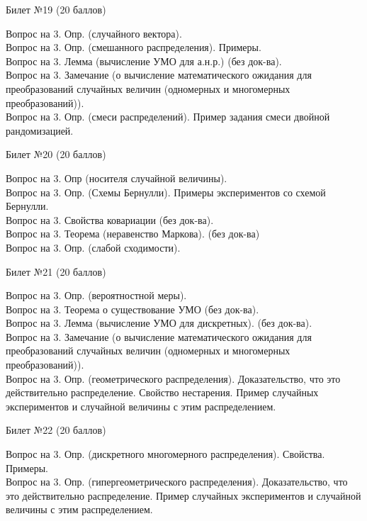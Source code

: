 \documentclass[preview]{standalone}
\begin{document}
\begin{center} {\Large Билет №19 (20 баллов)} \end{center}
Вопрос на 3.  Опр. (случайного вектора). \\
Вопрос на 3. Опр. (смешанного распределения). Примеры. \\
Вопрос на 3.  Лемма (вычисление УМО для а.н.р.)  (без док-ва). \\
Вопрос на 3. Замечание (о вычисление  математического ожидания для преобразований случайных величин (одномерных и многомерных преобразований)). \\
Вопрос на 3.   Опр. (смеси распределений). Пример задания смеси двойной рандомизацией. \\
\begin{center} {\Large Билет №20 (20 баллов)} \end{center}
Вопрос на 3.  Опр (носителя случайной величины). \\
Вопрос на 3.  Опр. (Схемы Бернулли). Примеры экспериментов со схемой Бернулли. \\
Вопрос на 3. Свойства ковариации (без док-ва). \\
Вопрос на 3.  Теорема (неравенство Маркова). (без док-ва) \\
Вопрос на 3.  Опр. (слабой сходимости). \\
\begin{center} {\Large Билет №21 (20 баллов)} \end{center}
Вопрос на 3. Опр. (вероятностной меры). \\
Вопрос на 3.  Теорема о существование УМО (без док-ва). \\
Вопрос на 3.  Лемма (вычисление УМО для дискретных). (без док-ва). \\
Вопрос на 3. Замечание (о вычисление  математического ожидания для преобразований случайных величин (одномерных и многомерных преобразований)). \\
Вопрос на 3.   Опр. (геометрического распределения). Доказательство, что это действительно распределение. Свойство нестарения. Пример случайных экспериментов и случайной величины с этим распределением. \\      
\begin{center} {\Large Билет №22 (20 баллов)} \end{center}
Вопрос на 3.  Опр. (дискретного многомерного распределения). Свойства. Примеры. \\
Вопрос на 3.  Опр. (гипергеометрического распределения). Доказательство, что это действительно распределение. Пример случайных экспериментов и случайной величины с этим распределением. \\      
\end{document}
